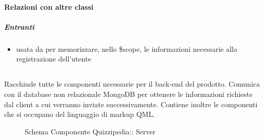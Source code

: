 \paragraph{Relazioni con altre classi}
\subparagraph{Entranti}
\begin{itemize}
\item usata da  per memorizzare, nello \$scope, le informazioni necessarie alla registrazione dell'utente
\end{itemize}
\subsection{}
Racchiude tutte le componenti necessarie per il back-end del prodotto. Comunica con il database non relazionale MongoDB per ottenere le informazioni richieste dal client a cui verranno inviate successivamente.
Contiene inoltre le componenti che si occupano del linguaggio di markup QML.
\begin{figure}[H]
\centering
\noindent{}
\caption[Schema Componente Server]{Schema Componente Quizzipedia:: Server}
\end{figure}
